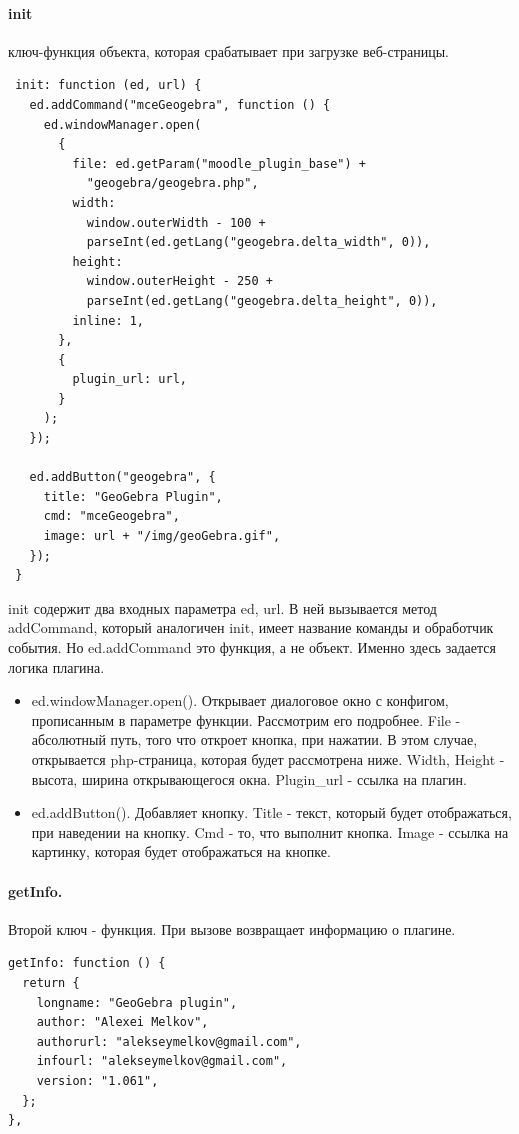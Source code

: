 \documentclass[14pt,Diplom]{diplomwork}
\begin{document}
\paragraph{init}
 ключ-функция объекта, которая срабатывает при загрузке веб-страницы.
\begin{verbatim} 
 init: function (ed, url) {
   ed.addCommand("mceGeogebra", function () {
     ed.windowManager.open(
       {
         file: ed.getParam("moodle_plugin_base") + 
           "geogebra/geogebra.php",
         width:
           window.outerWidth - 100 +
           parseInt(ed.getLang("geogebra.delta_width", 0)),
         height:
           window.outerHeight - 250 +
           parseInt(ed.getLang("geogebra.delta_height", 0)),
         inline: 1,
       },
       {
         plugin_url: url,
       }
     );
   });
 
   ed.addButton("geogebra", {
     title: "GeoGebra Plugin",
     cmd: "mceGeogebra",
     image: url + "/img/geoGebra.gif",
   });
 }
\end{verbatim}
 init содержит два входных параметра ed, url. В ней вызывается метод addCommand, который аналогичен init, имеет название команды и обработчик события. Но ed.addCommand это функция, а не объект. Именно здесь задается логика плагина.

\begin{itemize}
	\item ed.windowManager.open(). Открывает диалоговое окно с конфигом, прописанным в параметре функции. Рассмотрим его подробнее. File - абсолютный путь, того что откроет кнопка, при нажатии. В этом случае, открывается php-страница, которая будет рассмотрена ниже. Width, Height - высота, ширина открывающегося окна. Plugin\_url - ссылка на плагин.
	\item ed.addButton(). Добавляет кнопку. Title - текст, который будет отображаться, при наведении на кнопку. Cmd - то, что выполнит кнопка. Image - ссылка на картинку, которая будет отображаться на кнопке.
\end{itemize}

\paragraph{getInfo.}

Второй ключ - функция. При вызове возвращает информацию о плагине.
\begin{verbatim}
getInfo: function () {
  return {
    longname: "GeoGebra plugin",
    author: "Alexei Melkov",
    authorurl: "alekseymelkov@gmail.com",
    infourl: "alekseymelkov@gmail.com",
    version: "1.061",
  };
},
\end{verbatim}
\end{document}

